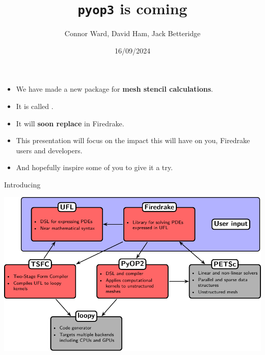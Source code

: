 \documentclass[aspectratio=169]{beamer}
\title{\texttt{pyop3} is coming}
\author{Connor Ward, David Ham, Jack Betteridge}
\date{16/09/2024}
\begin{document}
\frame{\titlepage}

\begin{frame}
  \begin{itemize}
    \item
      We have made a new package for \textbf{mesh stencil calculations}.
    \item
      It is called .
    \item
      It will \textbf{soon replace}  in Firedrake.
    \item
      This presentation will focus on the impact this will have on you, Firedrake users and developers.
    \item
      And hopefully inspire some of you to give it a try.
  \end{itemize}
\end{frame}

\begin{frame}{Introducing }
  \vspace{-1em}
  \begin{center}
    \includegraphics[width=.9\textwidth]{firedrake_structure_old.pdf}
  \end{center}
\end{frame}
\end{document}
